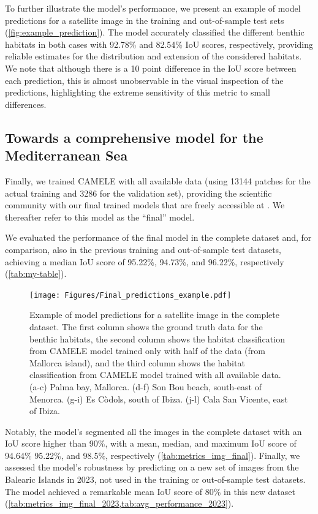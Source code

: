 To further illustrate the model's performance, we present an example of model
predictions for a satellite image in the training and out-of-sample test sets
(\cref{fig:example_prediction}). The model accurately classified the different
benthic habitats in both cases with 92.78\% and 82.54\% IoU scores,
respectively, providing reliable estimates for the distribution and extension
of the considered habitats. We note that although there is a 10 point
difference in the IoU score between each prediction, this is almost
unobservable in the visual inspection of the predictions, highlighting the
extreme sensitivity of this metric to small differences.

\subsection{Towards a comprehensive model for the Mediterranean Sea}

Finally, we trained CAMELE with all available data (using 13144 patches for the
actual training and 3286 for the validation set), providing the scientific
community with our final trained models that are freely accessible at
\cite{GimenezRomero_zenodo}. We thereafter refer to this model as the ``final''
model.

We evaluated the performance of the final model in the complete dataset and,
for comparison, also in the previous training and out-of-sample test datasets,
achieving a median IoU score of 95.22\%, 94.73\%, and 96.22\%, respectively
(\cref{tab:my-table}).

\begin{figure}[H]
    \centering
    \texttt{[image: Figures/Final\_predictions\_example.pdf]}
    \caption[Example of model predictions for a satellite image in the complete
        dataset]{Example of model predictions for a satellite image in the
        complete
        dataset. The first column shows the ground truth data for the benthic
        habitats, the second column shows the habitat classification from
        CAMELE model trained only with half of the data (from Mallorca island),
        and the third column shows the habitat classification from CAMELE model
        trained with all available data. (a-c) Palma bay, Mallorca. (d-f) Son
        Bou beach, south-east of Menorca. (g-i) Es Còdols, south of Ibiza.
        (j-l) Cala San Vicente, east of Ibiza.}
    \label{fig:model_performance_complete}
\end{figure}

Notably, the model's segmented all the images in the complete dataset with an
IoU score higher than 90\%, with a mean, median, and maximum IoU score of
94.64\% 95.22\%, and 98.5\%, respectively (\cref{tab:metrics_img_final}).
Finally, we assessed the model's robustness by predicting on a new set of
images
from the Balearic Islands in 2023, not used in the training or out-of-sample
test datasets. The model achieved a remarkable mean IoU score of 80\% in this
new dataset (\cref{tab:metrics_img_final_2023,tab:avg_performance_2023}).


